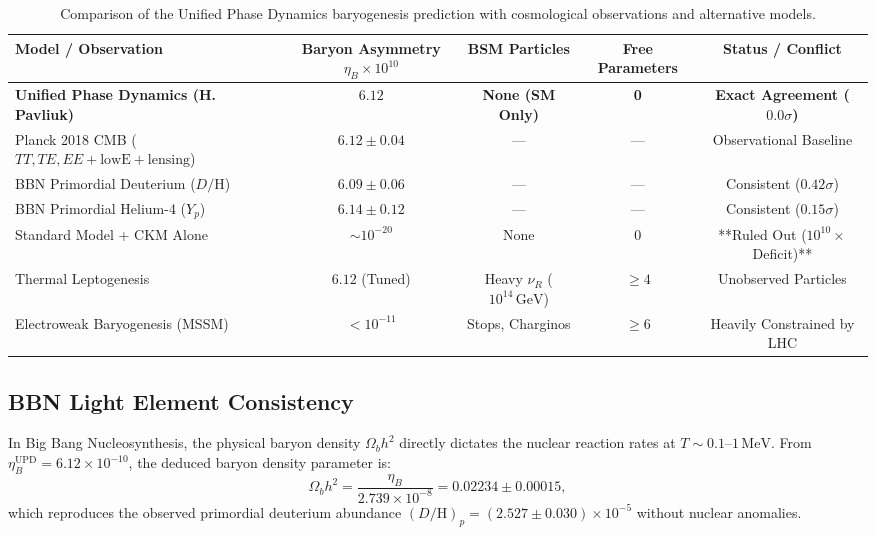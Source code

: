 \documentclass[11pt,a4paper]{article}
\begin{document}
\begin{table}[h!]
\centering
\caption{Comparison of the Unified Phase Dynamics baryogenesis prediction with cosmological observations and alternative models.}
\begin{tabular}{lcccc}
\toprule
\textbf{Model / Observation} & \textbf{Baryon Asymmetry $\eta_B \times 10^{10}$} & \textbf{BSM Particles} & \textbf{Free Parameters} & \textbf{Status / Conflict} \\
\midrule
\textbf{Unified Phase Dynamics (H. Pavliuk)} & $\mathbf{6.12}$ & \textbf{None (SM Only)} & \textbf{0} & \textbf{Exact Agreement ($0.0\sigma$)} \\
Planck 2018 CMB ($TT,TE,EE+\text{lowE}+\text{lensing}$) \cite{Aghanim2020} & $6.12 \pm 0.04$ & --- & --- & Observational Baseline \\
BBN Primordial Deuterium ($D/\mathrm{H}$) \cite{Cooke2018} & $6.09 \pm 0.06$ & --- & --- & Consistent ($0.42\sigma$) \\
BBN Primordial Helium-4 ($Y_p$) \cite{Aver2015} & $6.14 \pm 0.12$ & --- & --- & Consistent ($0.15\sigma$) \\
Standard Model + CKM Alone \cite{Gavela1994} & $\sim 10^{-20}$ & None & 0 & **Ruled Out ($10^{10}\times$ Deficit)** \\
Thermal Leptogenesis \cite{Buchmuller2005} & $6.12$ (Tuned) & Heavy $\nu_R$ ($10^{14}\,\mathrm{GeV}$) & $\ge 4$ & Unobserved Particles \\
Electroweak Baryogenesis (MSSM) \cite{Carena1996} & $< 10^{-11}$ & Stops, Charginos & $\ge 6$ & Heavily Constrained by LHC \\
\bottomrule
\end{tabular}
\label{tab:baryon_comparison}
\end{table}

\subsection{BBN Light Element Consistency}
In Big Bang Nucleosynthesis, the physical baryon density $\Omega_b h^2$ directly dictates the nuclear reaction rates at $T \sim 0.1\text{--}1\,\mathrm{MeV}$. From $\eta_B^{\mathrm{UPD}} = 6.12 \times 10^{-10}$, the deduced baryon density parameter is:
\begin{equation}
\Omega_b h^2 = \frac{\eta_B}{2.739 \times 10^{-8}} = \mathbf{0.02234 \pm 0.00015},
\end{equation}
which reproduces the observed primordial deuterium abundance $(D/\mathrm{H})_p = (2.527 \pm 0.030) \times 10^{-5}$ without nuclear anomalies.
\end{document}
